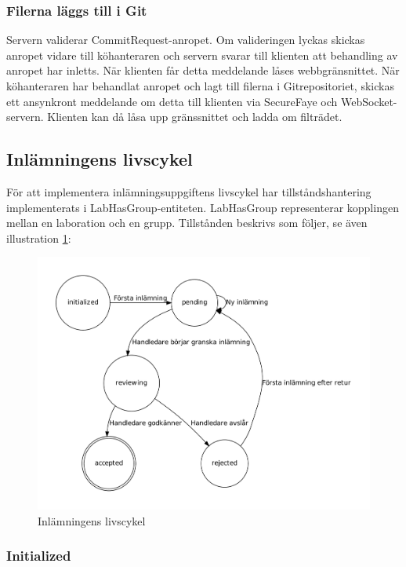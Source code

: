 \subsubsection{Filerna läggs till i Git}

Servern validerar CommitRequest-anropet. Om valideringen lyckas skickas anropet vidare till köhanteraren och servern svarar till klienten att behandling av anropet har inletts. När klienten får detta meddelande låses webbgränsnittet.
När köhanteraren har behandlat anropet och lagt till filerna i Gitrepositoriet, skickas ett ansynkront meddelande om detta till klienten via SecureFaye och WebSocket-servern. Klienten kan då låsa upp gränssnittet och ladda om filträdet.

\subsection{Inlämningens livscykel}

För att implementera inlämningsuppgiftens livscykel har tillståndshantering implementerats i LabHasGroup-entiteten. LabHasGroup representerar kopplingen mellan en laboration och en grupp.
Tillstånden beskrivs som följer, se även illustration \ref{fig:cyk}:

\begin{figure}
  \includegraphics[width=15.0cm]{fig/labgroup/state-machine.pdf}             
  \caption[Inlämningsuppgiftens livscykel]
  {Inlämningens livscykel}
  \label{fig:cyk}
\end{figure}

\subsubsection{Initialized}

